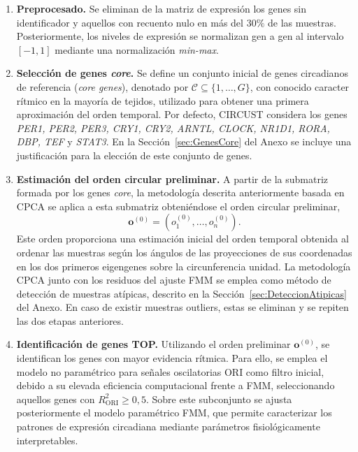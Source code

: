 \documentclass[12pt, a4paper]{report}
\begin{document}
\begin{enumerate}

\item \textbf{Preprocesado.} Se eliminan de la matriz de expresión los genes sin identificador y aquellos con recuento nulo en más del \(30\%\) de las muestras. Posteriormente, los niveles de expresión se normalizan gen a gen al intervalo \([-1,1]\) mediante una normalización \textit{min-max}.

\item \textbf{Selección de genes \textit{core}.} Se define un conjunto inicial de genes circadianos de referencia (\textit{core genes}), denotado por \(\mathcal{C}\subseteq\{1,\ldots,G\}\), con conocido caracter rítmico en la mayoría de tejidos,  utilizado para obtener una primera aproximación del orden temporal. Por defecto, CIRCUST considera los genes \textit{PER1, PER2, PER3, CRY1, CRY2, ARNTL, CLOCK, NR1D1, RORA, DBP, TEF} y \textit{STAT3}. En la Sección~\ref{sec:GenesCore} del Anexo se incluye una justificación para la elección de este conjunto de genes.

\item \textbf{Estimación del orden circular preliminar.} A partir de la submatriz formada por los genes \textit{core}, la metodología descrita anteriormente basada en CPCA se aplica a esta submatriz obteniéndose el orden circular preliminar,
\[
\mathbf{o}^{(0)}=\left(o^{(0)}_{1},\ldots,o^{(0)}_{n}\right).
\]
Este orden proporciona una estimación inicial del orden temporal obtenida al ordenar las muestras según los ángulos de las proyecciones de sus coordenadas en los dos primeros eigengenes sobre la circunferencia unidad. La metodología CPCA junto con los residuos del ajuste FMM se emplea como método de detección de muestras atípicas, descrito en la Sección~\ref{sec:DeteccionAtipicas} del Anexo.
En caso de existir muestras outliers, estas se eliminan y se repiten las dos etapas anteriores.

\item \textbf{Identificación de genes TOP.} Utilizando el orden preliminar \(\mathbf{o}^{(0)}\), se identifican los genes con mayor evidencia rítmica. Para ello, se emplea el modelo no paramétrico para señales oscilatorias ORI como filtro inicial, debido a su elevada eficiencia computacional frente a FMM, seleccionando aquellos genes con \(R^2_{\mathrm{ORI}}\geq 0{,}5\). Sobre este subconjunto se ajusta posteriormente el modelo paramétrico FMM, que permite caracterizar los patrones de expresión circadiana mediante parámetros fisiológicamente interpretables.


\end{enumerate}
\end{document}

